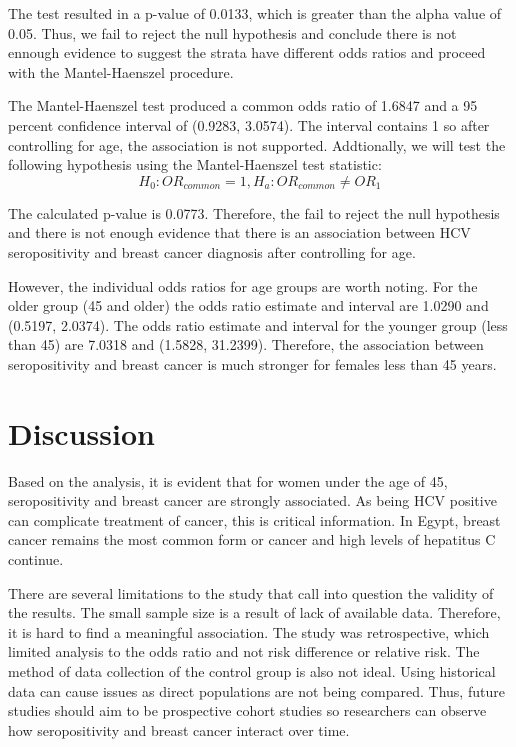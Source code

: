 \documentclass[12pt, titlepage]{article}
\begin{document}
The test resulted in a p-value of 0.0133, which is greater than
the alpha value of 0.05. Thus, we fail to reject the null hypothesis 
and conclude there is not ennough evidence to suggest the strata have different
odds ratios and proceed with the Mantel-Haenszel procedure. 

The Mantel-Haenszel test produced a common odds ratio of 1.6847 and 
a 95 percent confidence interval of (0.9283, 3.0574). The interval
contains 1 so after controlling for age, the association is not supported.
Addtionally, we will test the following hypothesis using the Mantel-Haenszel 
test statistic:
\[
H_{0}:OR_{common}=1, H_{a}:OR_{common}\neq{OR_{1}}
\]

The calculated p-value is 0.0773. Therefore, the fail to reject the null 
hypothesis and there is not enough evidence that there is an association 
between HCV seropositivity and breast cancer diagnosis after controlling for 
age. 

However, the individual odds ratios for age groups are worth noting. For 
the older group (45 and older) the odds ratio estimate and interval are 
1.0290 and (0.5197, 2.0374). The odds ratio estimate and interval for the 
younger group (less than 45) are 7.0318 and (1.5828, 31.2399). Therefore,
the association between seropositivity and breast cancer is much stronger
for females less than 45 years. 

\section{Discussion}
\label{sec:discuss}
  Based on the analysis, it is evident that for women under the age of 45,
seropositivity and breast cancer are strongly associated. As being HCV 
positive can complicate treatment of cancer, this is critical information.
In Egypt, breast cancer remains the most common form or cancer and high 
levels of hepatitus C continue. 

There are several limitations to the study that call into question the 
validity of the results. The small sample size is a result of lack 
of available data. Therefore, it is hard to find a meaningful 
association. The study was retrospective, which limited analysis to 
the odds ratio and not risk difference or relative risk. The method 
of data collection of the control group is also not ideal. Using historical 
data can cause issues as direct populations are not being compared. 
Thus, future studies should aim to be prospective cohort studies so 
researchers can observe how seropositivity and breast cancer interact 
over time. 
\end{document}
